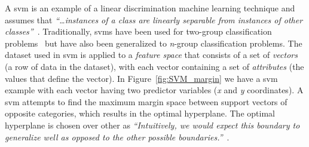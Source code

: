 A \gls{svm} is an example of a linear discrimination machine learning technique and assumes that \emph{``\ldots instances of a class are linearly separable from instances of other classes''}~\cite{ALP04}. Traditionally, \gls{svm}s have been used for two-group classification problems~\cite{CV95} but have also been generalized to \emph{n}-group classification problems. The dataset used in \gls{svm} is applied to a \emph{feature space} that consists of a set of \emph{vectors} (a row of data in the dataset), with each vector containing a set of \emph{attributes} (the values that define the vector). In Figure~\ref{fig:SVM_margin} we have a \gls{svm} example with each vector having two predictor variables (\emph{x} and \emph{y} coordinates). A \gls{svm} attempts to find the maximum margin space between support vectors of opposite categories, which results in the optimal hyperplane. The optimal hyperplane is chosen over other as \emph{``Intuitively, we would expect this boundary to generalize well as opposed to the other possible boundaries.''}~\cite{Gun98}.

